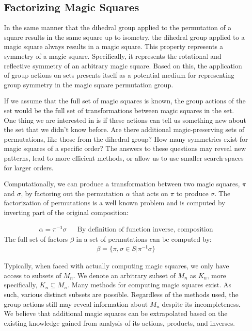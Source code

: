 \documentclass{rhumj_new}
\begin{document}
\subsection{Factorizing Magic Squares}

In the same manner that the dihedral group applied to the permutation of a square results in
the same square up to isometry, the dihedral group applied to a magic square always results in a
magic square. This property represents a symmetry of a magic square. Specifically, it represents
the rotational and reflective symmetry of an arbitrary magic square. Based on this, the application
of group actions on sets presents itself as a potential medium for representing group symmetry in
the magic square permutation group.

If we assume that the full set of magic squares is known, the group actions of the set would
be the full set of transformations between magic squares in the set. One thing we are interested in
is if these actions can tell us something new about the set that we didn't know before. Are there
additional magic-preserving sets of permutations, like those from the dihedral group? How many
symmetries exist for magic squares of a specific order? The answers to these questions may reveal
new patterns, lead to more efficient methods, or allow us to use smaller search-spaces for larger
orders.

Computationally, we can produce a transformation between two magic squares, $\pi$ and
$\sigma$, by factoring out the permutation $\alpha$ that acts on $\pi$ to produce $\sigma$. The
factorization of permutations is a well known problem and is computed by inverting part of the
original composition:

\begin{align}
  \alpha=\pi^{-1}\sigma &  & \text{By definition of function inverse, composition}
\end{align}
The full set of factors $\beta$ in a set of permutations can be computed by:
\begin{align}
  \beta = \{\pi,\sigma\in S | \pi^{-1}\sigma\}
\end{align}

Typically, when faced with actually computing magic squares, we only have access to subsets of
$M_n$. We denote an arbitrary subset of $M_n$ as $K_n$, more specifically, $K_n \subseteq M_n$.
Many methods for computing magic squares exist. As such, various distinct subsets are possible.
Regardless of the methods used, the group actions still may reveal information about $M_n$ despite
its incompleteness. We believe that additional magic squares can be extrapolated based on the
existing knowledge gained from analysis of its actions, products, and inverses.
\end{document}
